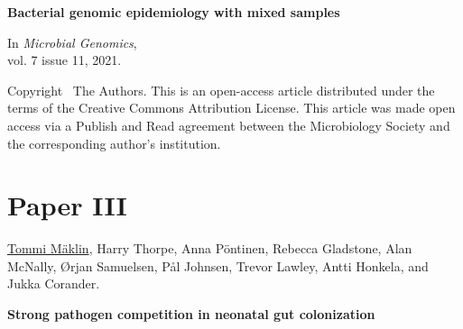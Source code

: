 \vspace{10pt}
\noindent\textbf{Bacterial genomic epidemiology with mixed samples}

\vspace{10pt}
\noindent In 
\emph{Microbial Genomics}, 
\\vol. 7 issue 11, 2021.

\vspace{60pt}
\noindent Copyright \textcopyright\ The Authors. This is an
open-access article distributed under the terms of the Creative
Commons Attribution License. This article was made open access via a
Publish and Read agreement between the Microbiology Society and the
corresponding author’s institution.

\cleardoublepage
%



\chapter*{Paper III}\thispagestyle{plain}







\vspace{80pt}
\underline{Tommi Mäklin}, Harry Thorpe, Anna Pöntinen, Rebecca Gladstone, Alan McNally, Ørjan
Samuelsen, Pål Johnsen, Trevor Lawley, Antti Honkela, and Jukka Corander.

\vspace{10pt}
\noindent\textbf{Strong pathogen competition in neonatal gut colonization}

